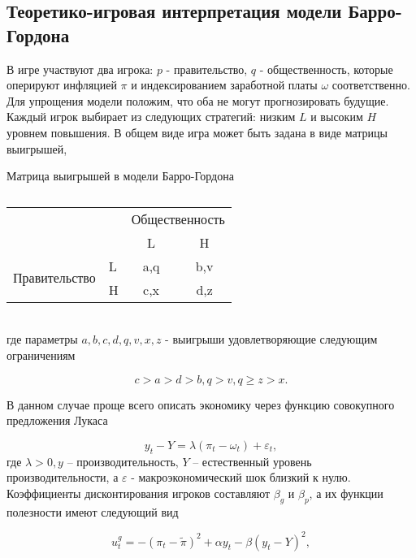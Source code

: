
\subsection{Теоретико-игровая интерпретация модели Барро-Гордона}

В игре участвуют два игрока: $p$ - правительство, $q$ - общественность, которые оперируют инфляцией $\pi$  и индексированием заработной платы $\omega$ соответственно. Для упрощения модели положим, что оба не могут прогнозировать будущие. Каждый игрок выбирает из следующих стратегий: низким $L$  и высоким  $H$ уровнем повышения. В общем виде игра может быть задана в виде матрицы выигрышей, 
\begin{table}[h]
	\centering
	\caption{}
 Матрица выигрышей в модели Барро-Гордона\\
\normalsize
\begin{tabular}{|l|l|c|c|}
	\hline
	\multicolumn{2}{|l|}{\multirow{2}{*}{}} & \multicolumn{2}{l|}{Общественность} \\ \cline{3-4} 
	\multicolumn{2}{|l|}{}                  & L                & H                \\ \hline
	\multirow{2}{*}{Правительство}    & L   & a,q              & b,v              \\ \cline{2-4} 
	& H   & c,x              & d,z              \\ \hline
\end{tabular}
\end{table}\\
где параметры $a,b,c,d,q,v,x,z$  - выигрыши удовлетворяющие следующим ограничениям~\cite{libich2008macroeconomic}

\begin{equation}
c>a>d>b, q>v, q\geqslant z>x.
\label{eq:sec:ot:restrictions}
\end{equation}

В данном случае проще всего описать экономику через функцию совокупного предложения Лукаса~\cite{libichIncorpo}

\begin{equation}
\label{eq:sec:ot:lucas}
y_t - Y = \lambda(\pi_t - \omega_t)+\varepsilon_t,
\end{equation}
где  $\lambda>0, y$  – производительность, $Y$ – естественный уровень производительности, а  $\varepsilon$ - макроэкономический шок близкий к нулю. Коэффициенты дисконтирования игроков составляют $\beta_g$ и $\beta_p$, а их функции  полезности  имеют следующий вид 

\begin{equation}
\label{eq:sec:ot:govUtil}
u^g_t=-(\pi_t - \tilde{\pi})^2 + \alpha y_t - \beta(y_t-Y)^2,
\end{equation}

